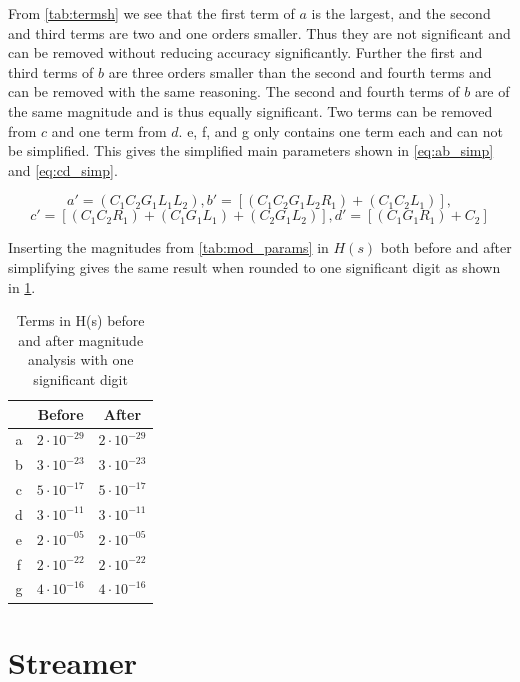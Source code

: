 From \cref{tab:termsh} we see that the first term of $a$ is the largest, and the second and third terms are two and one orders smaller. Thus they are not significant and can be removed without reducing accuracy significantly. Further the first and third terms of $b$ are three orders smaller than the second and fourth terms and can be removed with the same reasoning. The second and fourth terms of $b$ are of the same magnitude and is thus equally significant. Two terms can be removed from $c$ and one term from $d$. e, f, and g only contains one term each and can not be simplified. This gives the simplified main parameters shown in \cref{eq:ab_simp} and \cref{eq:cd_simp}.

\begin{equation} \label{eq:ab_simp}
    a' = (C_1 C_2 G_1 L_1 L_2), b' = [(C_1 C_2 G_1 L_2 R_1)+(C_1 C_2 L_1)],
\end{equation}
\begin{equation} \label{eq:cd_simp}
    c' = [(C_1 C_2 R_1)+(C_1 G_1 L_1)+(C_2 G_1 L_2)], d' = [(C_1 G_1 R_1) + C_2]
\end{equation}

Inserting the magnitudes from \cref{tab:mod_params} in $H(s)$ both before and after simplifying gives the same result when rounded to one significant digit as shown in \cref{tab:beforeafter}.

\begin{table}[H]
    \centering
    \begin{tabular}{c|c|c}
          & Before             & After \\ \hline
        a & $2 \cdot 10^{-29}$ & $2 \cdot 10^{-29}$ \\
        b & $3 \cdot 10^{-23}$ & $3 \cdot 10^{-23}$ \\
        c & $5 \cdot 10^{-17}$ & $5 \cdot 10^{-17}$ \\
        d & $3 \cdot 10^{-11}$ & $3 \cdot 10^{-11}$ \\
        e & $2 \cdot 10^{-05}$ & $2 \cdot 10^{-05}$ \\
        f & $2 \cdot 10^{-22}$ & $2 \cdot 10^{-22}$ \\
        g & $4 \cdot 10^{-16}$ & $4 \cdot 10^{-16}$ \\
    \end{tabular}
    \caption{Terms in H(s) before and after magnitude analysis with one significant digit}
    \label{tab:beforeafter}
\end{table}

\section{Streamer}
\label{sec:arc}

